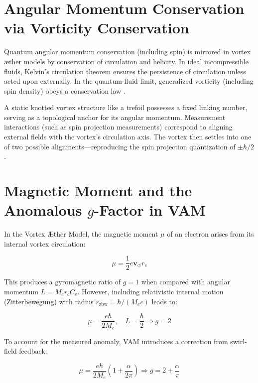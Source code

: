 \documentclass[a4paper, aps,preprint,superscriptaddress, 12pt]{revtex4}
\begin{document}
\section*{Angular Momentum Conservation via Vorticity Conservation}

Quantum angular momentum conservation (including spin) is mirrored in vortex æther models by conservation of circulation and helicity. In ideal incompressible fluids, Kelvin's circulation theorem ensures the persistence of circulation unless acted upon externally. In the quantum-fluid limit, generalized vorticity (including spin density) obeys a conservation law \cite{PRL2011}.


A static knotted vortex structure like a trefoil possesses a fixed linking number, serving as a topological anchor for its angular momentum. Measurement interactions (such as spin projection measurements) correspond to aligning external fields with the vortex's circulation axis. The vortex then settles into one of two possible alignments—reproducing the spin projection quantization of $\pm \hbar/2$.


\section*{Magnetic Moment and the Anomalous \texorpdfstring{$g$}{g}-Factor in VAM}

In the Vortex Æther Model, the magnetic moment $\mu$ of an electron arises from its internal vortex circulation:

\begin{equation}

\mu = \frac{1}{2} e \mathbf{v}_{\scriptscriptstyle\boldsymbol{\circlearrowleft}} r_c

\end{equation}

This produces a gyromagnetic ratio of $g=1$ when compared with angular momentum $L = M_e r_c C_e$. However, including relativistic internal motion (Zitterbewegung) with radius $r_{\text{zbw}} = \hbar / (M_e c)$ leads to:

\begin{equation}

\mu = \frac{e \hbar}{2 M_e}, \quad L = \frac{\hbar}{2} \Rightarrow g = 2

\end{equation}

To account for the measured anomaly, VAM introduces a correction from swirl-field feedback:

\begin{equation}

\mu = \frac{e \hbar}{2 M_e} \left(1 + \frac{\alpha}{2\pi} \right) \Rightarrow g = 2 + \frac{\alpha}{\pi}

\end{equation}
\end{document}
